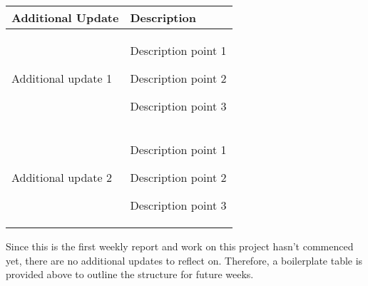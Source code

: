 \begin{table}[!h]
    \centering
    \begin{tabularx}{\textwidth}{|l|X|}
        \hline
        Additional Update & Description \\
        \hline
        \hline
        Additional update 1 & 
        \begin{myitemize}
            \item Description point 1
            \item Description point 2
            \item Description point 3
        \end{myitemize} \\
        \hline
        Additional update 2 & 
        \begin{myitemize}
            \item Description point 1
            \item Description point 2
            \item Description point 3
        \end{myitemize} \\
        \hline
    \end{tabularx}
\end{table}

Since this is the first weekly report and work on this project hasn't commenced yet, there are no additional updates to reflect on. Therefore, a boilerplate table is provided above to outline the structure for future weeks.